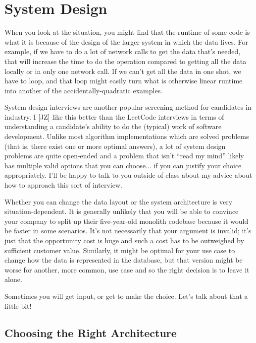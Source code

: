 




\section*{System Design}
When you look at the situation, you might find that the runtime of some code is what it is because of the design of the larger system in which the data lives. For example, if we have to do a lot of network calls to get the data that's needed, that will increase the time to do the operation compared to getting all the data locally or in only one network call. If we can't get all the data in one shot, we have to loop, and that loop might easily turn what is otherwise linear runtime into another of the accidentally-quadratic examples.

System design interviews are another popular screening method for candidates in industry. I [JZ] like this better than the LeetCode interviews in terms of understanding a candidate's ability to do the (typical) work of software development. Unlike most algorithm implementations which are solved problems (that is, there exist one or more optimal answers), a lot of system design problems are quite open-ended and a problem that isn't ``read my mind'' likely has multiple valid options that you can choose... if you can justify your choice appropriately. I'll be happy to talk to you outside of class about my advice about how to approach this sort of interview.

Whether you can change the data layout or the system architecture is very situation-dependent. It is generally unlikely that you will be able to convince your company to split up their five-year-old monolith codebase because it would be faster in some scenarios. It's not necessarily that your argument is invalid; it's just that the opportunity cost is huge and such a cost has to be outweighed by sufficient customer value. Similarly, it might be optimal for your use case to change how the data is represented in the database, but that version might be worse for another, more common, use case and so the right decision is to leave it alone.

Sometimes you will get input, or get to make the choice. Let's talk about that a little bit!

\subsection*{Choosing the Right Architecture}

